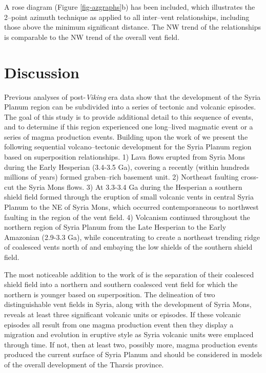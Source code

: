 A rose diagram (Figure \ref{fig-azgraphs}b) has been included, which illustrates the 2--point azimuth technique as applied to all inter--vent relationships, including those above the minimum significant distance. The NW trend of the relationships is comparable to the NW trend of the overall vent field.

\section{Discussion}

Previous analyses of post-\textit{Viking} era data show that the development of the Syria Planum region can be subdivided into a series of tectonic and volcanic episodes. The goal of this study is to provide additional detail to this sequence of events, and to determine if this region experienced one long--lived magmatic event or a series of magma production events. Building upon the work of \citet{baptista2008swarm} we present the following sequential volcano--tectonic development for the Syria Planum region based on superposition relationships. 1) Lava flows erupted from Syria Mons during the Early Hesperian (3.4-3.5 Ga), covering a recently (within hundreds millions of years) formed graben--rich basement unit. 2) Northeast faulting cross-cut the Syria Mons flows. 3) At 3.3-3.4 Ga during the Hesperian a southern shield field formed through the eruption of small volcanic vents in central Syria Planum to the NE of Syria Mons, which occurred contemporaneous to northwest faulting in the region of the vent field. 4) Volcanism continued throughout the northern region of Syria Planum from the Late Hesperian to the Early Amazonian (2.9-3.3 Ga), while concentrating to create a northeast trending ridge of coalesced vents north of and embaying the low shields of the southern shield field.

The most noticeable addition to the work of \citet{baptista2008swarm} is the separation of their coalesced shield field into a northern and southern coalesced vent field for which the northern is younger based on superposition. The delineation of two distinguishable vent fields in Syria, along with the development of Syria Mons, reveals at least three significant volcanic units or episodes. If these volcanic episodes all result from one magma production event then they display a migration and evolution in eruptive style as Syria volcanic units were emplaced through time. If not, then at least two, possibly more, magma production events produced the current surface of Syria Planum and should be considered in models of the overall development of the Tharsis province.


